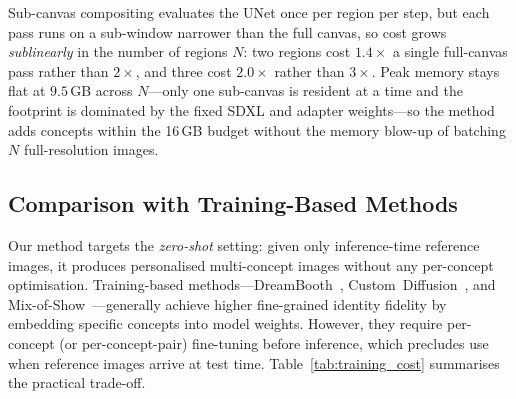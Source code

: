 \documentclass[10pt,twocolumn,letterpaper]{article}
\begin{document}
\begin{table}[htbp]
\centering
\caption{Inference cost (RTX\,5080\,16\,GB, $768\!\times\!768$, 30
         DPM-Solver++ steps, seed 42; \texttt{time.perf\_counter}, 5
         timed runs after 2 warm-ups, identical inline sampler, no CPU
         offload, VAE decode excluded).}
\label{tab:timing}
\end{table}

Sub-canvas compositing evaluates the UNet once per region per step, but
each pass runs on a sub-window narrower than the full canvas, so cost
grows \emph{sublinearly} in the number of regions $N$: two regions cost
$1.4\times$ a single full-canvas pass rather than $2\times$, and three
cost $2.0\times$ rather than $3\times$.  Peak memory stays flat at
$9.5$\,GB across $N$---only one sub-canvas is resident at a time and the
footprint is dominated by the fixed SDXL and adapter weights---so the
method adds concepts within the 16\,GB budget without the memory
blow-up of batching $N$ full-resolution images.


\subsection{Comparison with Training-Based Methods}
\label{sec:training_compare}

Our method targets the \emph{zero-shot} setting: given only inference-time
reference images, it produces personalised multi-concept images without
any per-concept optimisation.
Training-based methods—DreamBooth~\cite{ruiz2023dreambooth},
Custom~Diffusion~\cite{kumari2023multi}, and
Mix-of-Show~\cite{gu2023mix}—generally achieve higher fine-grained
identity fidelity by embedding specific concepts into model weights.
However, they require per-concept (or per-concept-pair) fine-tuning
before inference, which precludes use when reference images arrive at
test time.
Table~\ref{tab:training_cost} summarises the practical trade-off.
\end{document}
